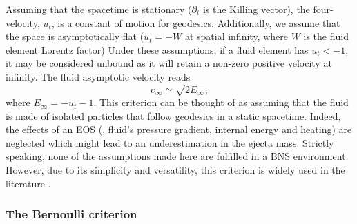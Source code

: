 Assuming that the spacetime is stationary ($\partial_t$ is the Killing vector), %
the four-velocity, $u_t$, is a constant of motion for geodesics. 
%
Additionally, we assume that the space is asymptotically flat  
($u_t = -W$ at spatial infinity, where $W$ is the fluid element Lorentz factor)  
Under these assumptions, if a fluid element has $u_t < -1$, 
it may be considered unbound as it will retain a non-zero positive velocity at infinity. 
%
The fluid asymptotic velocity reads 
\begin{equation}
\upsilon_{\infty} \simeq \sqrt{2E_{\infty}}, %
\end{equation}
%
where $E_{\infty} = -u_t - 1$.
%
This criterion can be thought of as assuming that the fluid 
is made of isolated particles that follow geodesics in
a static spacetime. Indeed, the effects of an \ac{EOS} 
(\ie, fluid's pressure gradient, internal energy and heating) %
are neglected which might lead to an 
underestimation in the ejecta mass. 
%
%
Strictly speaking, none of the assumptions made here are 
fulfilled in a \ac{BNS} \pmerg{} environment. However, due to its 
simplicity and versatility, this criterion 
is widely used in the literature 
\citep[\eg][]{Radice:2018pdn,Vincent:2019kor}.



\subsubsection{The Bernoulli criterion}

